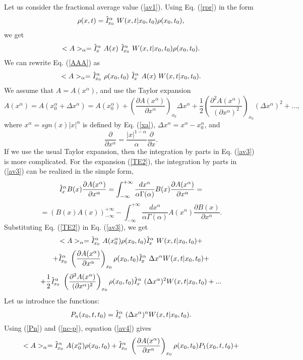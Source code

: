 \documentclass[12pt]{article}
\newcommand{\be}{\begin{equation}}
\newcommand{\ee}{\end{equation}}
\begin{document}
Let us consider the fractional average value (\ref{av1}).
Using Eq. (\ref{rpr}) in the form
\be  \label{rpr2} \rho(x,t) =
\hat {\it I}^{\alpha}_{x_0}  \ W(x,t|x_0,t_0) \rho(x_0,t_0) , \ee
we get 
\be \label{AAA}
<A>_{\alpha}=\hat {\it I}^{\alpha}_x  \ A(x)\ 
\hat {\it I}^{\alpha}_{x_0}  \ W(x,t|x_0,t_0) \rho(x_0,t_0) . \ee
We can rewrite Eq. (\ref{AAA}) as 
\be \label{av3} <A>_{\alpha}=\hat {\it I}^{\alpha}_{x_0}  \
\rho(x_0,t_0) \ \hat {\it I}^{\alpha}_x  \ A(x) \ W(x,t|x_0,t_0)  . \ee
We assume that $A=A(x^{\alpha})$, and use the Taylor expansion 
\be \label{TE2}
A(x^{\alpha})=A(x^{\alpha}_0+\Delta x^{\alpha})=A(x^{\alpha}_0)+
\left(\frac{\partial A(x^{\alpha})}{\partial x^{\alpha}} \right)_{x_0}
\Delta x^{\alpha}+ 
\frac{1}{2}\left(\frac{\partial^2 A(x^{\alpha})}{(\partial x^{\alpha})^2}
\right)_{x_0} (\Delta x^{\alpha})^2+..., \ee
where $x^{\alpha}=sgn(x)|x|^{\alpha}$ is defined by Eq. (\ref{xa}),
$\Delta x^{\alpha}=x^{\alpha}-x^{\alpha}_0$, and
\be \label{am}
\frac{\partial}{\partial x^{\alpha}}= \frac{|x|^{1-\alpha}}{\alpha}
\frac{\partial}{\partial x} .
\ee
If we use the usual Taylor expansion, then 
the integration by parts in Eq. (\ref{av3}) is more complicated. 
For the expansion (\ref{TE2}), the integration by parts 
in (\ref{av3}) can be realized in the simple form, 
\[ \hat {\it I}^{\alpha}_x B(x) 
\frac{\partial A(x^{\alpha})}{\partial x^{\alpha}}=
\int^{+\infty}_{-\infty} \frac{dx^{\alpha}}{\alpha \Gamma(\alpha)} B(x)
\frac{\partial A(x^{\alpha})}{\partial x^{\alpha}}=\]
\[ =\left( B(x)A(x) \right)^{+\infty}_{-\infty}-
\int^{+\infty}_{-\infty} 
\frac{dx^{\alpha}}{\alpha \Gamma(\alpha)} A(x^{\alpha})
\frac{\partial B(x)}{\partial x^{\alpha}} . \]
Substituting Eq. (\ref{TE2}) in Eq. (\ref{av3}), we get
\[ <A>_{\alpha}= \hat {\it I}^{\alpha}_{x_0}  \ A(x^{\alpha}_0) \rho(x_0,t_0)
\hat {\it I}^{\alpha}_x  \  W(x,t|x_0,t_0) +  \]
\[ +\hat {\it I}^{\alpha}_{x_0}  \
\left(\frac{\partial A(x^{\alpha})}{\partial x^{\alpha}}\right)_{x_0} 
\rho(x_0,t_0) \hat {\it I}^{\alpha}_x  \ \Delta x^{\alpha}  W(x,t|x_0,t_0)+\]
\be \label{av4}
+\frac{1}{2} \hat {\it I}^{\alpha}_{x_0}  \
\left(\frac{\partial^2 A(x^{\alpha})}{(\partial x^{\alpha})^2}\right)_{x_0}
\rho(x_0,t_0)  
\hat {\it I}^{\alpha}_x  \ (\Delta x^{\alpha})^2  W(x,t|x_0,t_0)+...  \ee
Let us introduce the functions:
\be \label{Pn} P_n(x_0,t,t_0)=\hat {\it I}^{\alpha}_x  \ (\Delta x^{\alpha})^n
W(x,t|x_0,t_0) . \ee
Using (\ref{Pn}) and (\ref{nc-p}), equation (\ref{av4}) gives 
\[ <A>_{\alpha}= \hat {\it I}^{\alpha}_{x_0} 
\ A(x^{\alpha}_0) \rho(x_0,t_0) +  
\hat {\it I}^{\alpha}_{x_0}  \
\left(\frac{\partial A(x^{\alpha})}{\partial x^{\alpha}}\right)_{x_0} 
\rho(x_0,t_0) P_1(x_0,t,t_0)+\]
\end{document}
